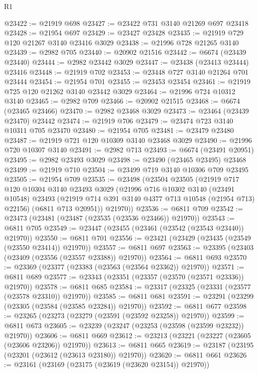 \begin{lexlean}{R1}
\begin{coremodule}
@23422 := @21919 @698
@23427 := @23422 @731 @3140 @21269 @697 @23418
@23428 := @21954 @697
@23429 := @23427 @23428
@23435 := @21919 @729 @120 @21267 @3140 @23416 @3029
@23438 := @21996 @728 @21265 @3140
@23439 := @2982 @705
@23440 := @20902 @21516
@23442 := @6674 (@23439 @23440)
@23444 := @2982 @23442 @3029
@23447 := @23438 (@23413 @23444) @23416
@23448 := @21919 @702
@23453 := @23448 @727 @3140 @21264 @701 @23444
@23454 := @21954 @701
@23455 := @23453 @23454
@23461 := @21919 @725 @120 @21262 @3140 @23442 @3029
@23464 := @21996 @724 @10312 @3140
@23465 := @2982 @709
@23466 := @20902 @21515
@23468 := @6674 (@23465 @23466)
@23470 := @2982 @23468 @3029
@23473 := @23464 (@23439 @23470) @23442
@23474 := @21919 @706
@23479 := @23474 @723 @3140 @10311 @705 @23470
@23480 := @21954 @705
@23481 := @23479 @23480
@23487 := @21919 @721 @120 @10309 @3140 @23468 @3029
@23490 := @21996 @720 @10307 @3140
@23491 := @2982 @713
@23493 := @6674 (@23491 @20951)
@23495 := @2982 @23493 @3029
@23498 := @23490 (@23465 @23495) @23468
@23499 := @21919 @710
@23504 := @23499 @719 @3140 @10306 @709 @23495
@23505 := @21954 @709
@23535 := @23498
    (@23504
      @23505
      (@21919
        @717
        @120
        @10304
        @3140
        @23493
        @3029
        (@21996
          @716
          @10302
          @3140
          (@23491 @10548)
          @23493
          (@21919 @714 @391 @3140 @4377 @713 @10548 (@21954 @713) @22156)
          (@6811 @713 @20951))
        @21970))
@23536 := @6811 @709
@23542 := @23473 (@23481 (@23487 (@23535 (@23536 @23466)) @21970))
@23543 := @6811 @705
@23549 := @23447 (@23455 (@23461 (@23542 (@23543 @23440)) @21970))
@23550 := @6811 @701
@23556 := @23421 (@23429 (@23435 (@23549 (@23550 @23414)) @21970))
@23557 := @6811 @697
@23563 := @23395 (@23403 (@23409 (@23556 (@23557 @23388)) @21970))
@23564 := @6811 @693
@23570 := @23369 (@23377 (@23383 (@23563 (@23564 @23362)) @21970))
@23571 := @6811 @689
@23577 := @23343 (@23351 (@23357 (@23570 (@23571 @23336)) @21970))
@23578 := @6811 @685
@23584 := @23317 (@23325 (@23331 (@23577 (@23578 @23310)) @21970))
@23585 := @6811 @681
@23591 := @23291 (@23299 (@23305 (@23584 (@23585 @23284)) @21970))
@23592 := @6811 @677
@23598 := @23265 (@23273 (@23279 (@23591 (@23592 @23258)) @21970))
@23599 := @6811 @673
@23605 := @23239 (@23247 (@23253 (@23598 (@23599 @23232)) @21970))
@23606 := @6811 @669
@23612 := @23213 (@23221 (@23227 (@23605 (@23606 @23206)) @21970))
@23613 := @6811 @665
@23619 := @23187 (@23195 (@23201 (@23612 (@23613 @23180)) @21970))
@23620 := @6811 @661
@23626 := @23161 (@23169 (@23175 (@23619 (@23620 @23154)) @21970))

\end{coremodule}
\end{lexlean}
